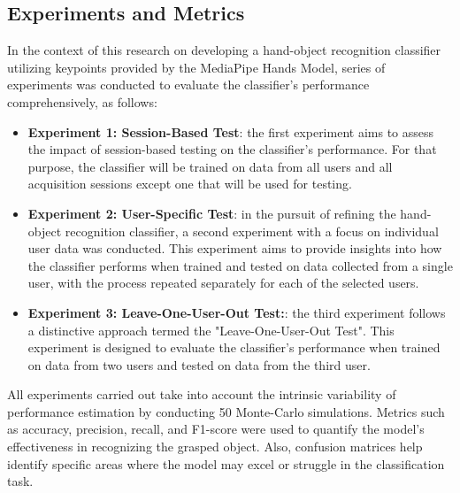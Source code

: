 \subsection{Experiments and Metrics}
In the context of this research on developing a hand-object recognition classifier utilizing keypoints provided by the MediaPipe Hands Model, series of experiments was conducted to evaluate the classifier's performance comprehensively, as follows:
\begin{itemize}
  
  \item \textbf{Experiment 1: Session-Based Test}: the first experiment aims to assess the impact of session-based testing on the classifier's performance. For that purpose, the classifier will be trained on data from all users and all acquisition sessions except one that will be used for testing.
  
  \item \textbf{Experiment 2: User-Specific Test}: in the pursuit of refining the hand-object recognition classifier, a second experiment with a focus on individual user data was conducted. This experiment aims to provide insights into how the classifier performs when trained and tested on data collected from a single user, with the process repeated separately for each of the selected users.
  
  \item \textbf{Experiment 3: Leave-One-User-Out Test:}: the third experiment follows a distinctive approach termed the "Leave-One-User-Out Test". This experiment is designed to evaluate the classifier's performance when trained on data from two users and tested on data from the third user.
  
\end{itemize}

All experiments carried out take into account the intrinsic variability of performance estimation by conducting 50 Monte-Carlo simulations. Metrics such as accuracy, precision, recall, and F1-score were used to quantify the model’s effectiveness in recognizing the grasped object. Also, confusion matrices help identify specific areas where the model may excel or struggle in the classification task.

